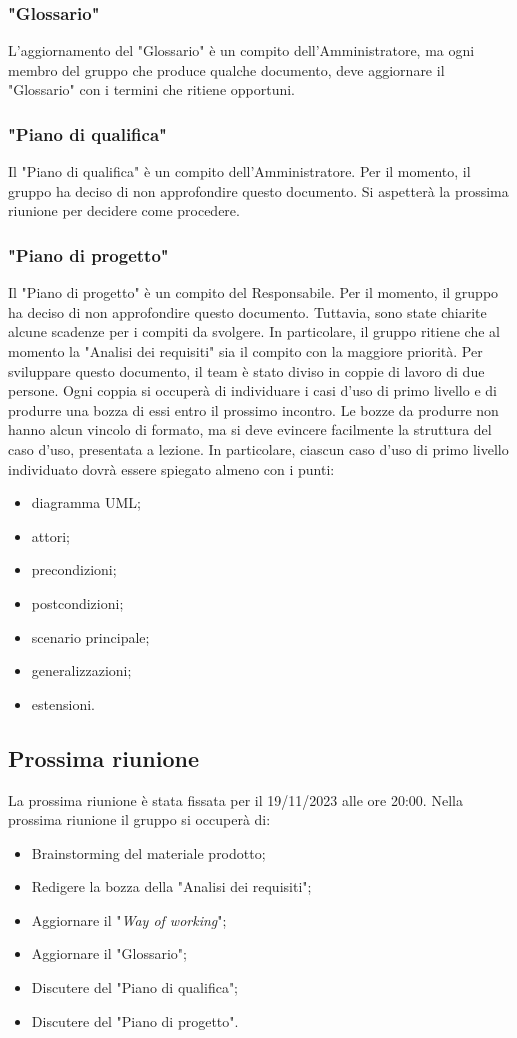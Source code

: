 \subsubsection{"Glossario"}
L'aggiornamento del "Glossario" è un compito dell'Amministratore, ma ogni membro
del gruppo che produce qualche documento, deve aggiornare il "Glossario" con i
termini che ritiene opportuni.

\subsubsection{"Piano di qualifica"}
Il "Piano di qualifica" è un compito dell'Amministratore. Per il momento, il
gruppo ha deciso di non approfondire questo documento. Si aspetterà la prossima
riunione per decidere come procedere.

\subsubsection{"Piano di progetto"}
Il "Piano di progetto" è un compito del Responsabile. Per il momento, il gruppo
ha deciso di non approfondire questo documento. Tuttavia, sono state chiarite
alcune scadenze per i compiti da svolgere. In particolare, il gruppo ritiene
che al momento la "Analisi dei requisiti" sia il compito con la maggiore priorità.
Per sviluppare questo documento, il team è stato diviso in coppie di lavoro di
due persone. Ogni coppia si occuperà di individuare i casi d'uso di primo
livello e di produrre una bozza di essi entro il prossimo incontro. Le bozze da
produrre non hanno alcun vincolo di formato, ma si deve evincere facilmente la
struttura del caso d'uso, presentata a lezione. In particolare, ciascun caso
d'uso di primo livello individuato dovrà essere spiegato almeno con i punti:
\begin{itemize}
	\item diagramma UML;
	\item attori;
	\item precondizioni;
	\item postcondizioni;
	\item scenario principale;
	\item generalizzazioni;
	\item estensioni.
\end{itemize}

\subsection{Prossima riunione}
La prossima riunione è stata fissata per il 19/11/2023 alle ore 20:00. Nella
prossima riunione il gruppo si occuperà di:
\begin{itemize}
	\item Brainstorming del materiale prodotto;
	\item Redigere la bozza della "Analisi dei requisiti";
	\item Aggiornare il "\textit{Way of working}";
	\item Aggiornare il "Glossario";
	\item Discutere del "Piano di qualifica";
	\item Discutere del "Piano di progetto".
\end{itemize}

